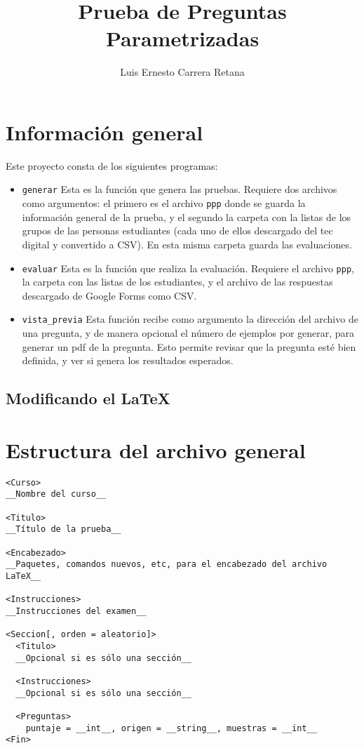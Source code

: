 \documentclass[12pt]{article}
\title{Prueba de Preguntas Parametrizadas}
\author{Luis Ernesto Carrera Retana}
\theoremstyle{definition}
\begin{document}
\maketitle

\section{Información general}

Este proyecto consta de los siguientes programas:
\begin{itemize}
  \item \verb|generar| Esta es la función que genera las pruebas. Requiere dos archivos como argumentos: el primero es el archivo \verb|ppp| donde se guarda la información general de la prueba, y el segundo la carpeta con la listas de los grupos de las personas estudiantes (cada uno de ellos descargado del tec digital y convertido a CSV). En esta misma carpeta guarda las evaluaciones.

  \item \verb|evaluar| Esta es la función que realiza la evaluación. Requiere el archivo \verb|ppp|, la carpeta con las listas de los estudiantes, y el archivo de las respuestas descargado de Google Forms como CSV.

  \item \verb|vista_previa| Esta función recibe como argumento la dirección del archivo de una pregunta, y de manera opcional el número de ejemplos por generar, para generar un pdf de la pregunta. Esto permite revisar que la pregunta esté bien definida, y ver si genera los resultados esperados.
\end{itemize}

\subsection{Modificando el \LaTeX}

\section{Estructura del archivo general}
\begin{verbatim}
<Curso>
__Nombre del curso__

<Titulo>
__Título de la prueba__

<Encabezado>
__Paquetes, comandos nuevos, etc, para el encabezado del archivo LaTeX__

<Instrucciones>
__Instrucciones del examen__

<Seccion[, orden = aleatorio]>
  <Titulo>
  __Opcional si es sólo una sección__

  <Instrucciones>
  __Opcional si es sólo una sección__

  <Preguntas>
    puntaje = __int__, origen = __string__, muestras = __int__
<Fin>
\end{verbatim}
\end{document}
